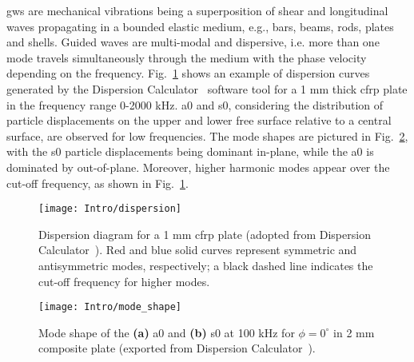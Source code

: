 \documentclass[11pt,a4paper,final]{report}
\begin{document}
\Acp{gw} are mechanical vibrations being a superposition of shear and longitudinal waves propagating in a bounded elastic medium, e.g., bars, beams, rods, plates and shells. 
Guided waves are multi-modal and dispersive, i.e. more than one mode travels simultaneously through the medium with the phase velocity depending on the frequency.
Fig.~\ref{fig:dispersion} shows an example of dispersion curves generated by the Dispersion Calculator~\cite{huber2021dispersion} software tool for a 1 mm thick \ac{cfrp} plate in the frequency range 0-2000 kHz.
\Ac{a0} and \ac{s0}, considering the distribution of particle displacements on the upper and lower free surface relative to a central surface, are observed for low frequencies.
The mode shapes are pictured in Fig.~\ref{fig:mode_shape}, with the \ac{s0} particle displacements being dominant in-plane, while the \ac{a0} is dominated by out-of-plane.
Moreover, higher harmonic modes appear over the cut-off frequency, as shown in Fig.~\ref{fig:dispersion}.
\begin{figure}
\texttt{[image: Intro/dispersion]}
\caption{Dispersion diagram for a 1 mm \ac{cfrp} plate (adopted from Dispersion Calculator~\cite{huber2021dispersion}). Red and blue solid curves represent symmetric and antisymmetric modes, respectively; a black dashed line indicates the cut-off frequency for higher modes.}
	\label{fig:dispersion}
\end{figure}
\begin{figure}
\texttt{[image: Intro/mode\_shape]}
\caption{Mode shape of the \textbf{(a)} \ac{a0} and \textbf{(b)} \ac{s0} at 100 kHz for \(\phi=0^{\circ}\) in 2 mm composite plate (exported from Dispersion Calculator~\cite{huber2021dispersion}).}
	\label{fig:mode_shape}
\end{figure}
\end{document}
